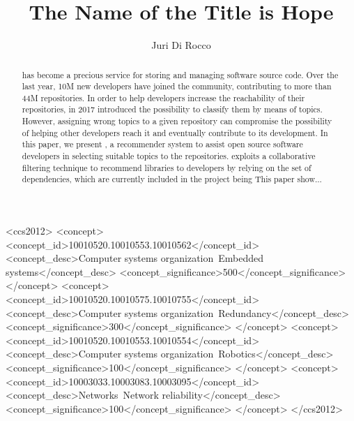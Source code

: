 \documentclass[sigconf]{acmart}
\begin{document}
\title{The Name of the Title is Hope}



\author{Juri Di Rocco}
\affiliation{%
  \institution{Universit\'a degli studi dell'Aquila}
}

\renewcommand{\shortauthors}{Juri Di Rocco, et al.}

\begin{abstract}
\GH has become a precious service for  storing and managing software source code. Over the last year, 10M new developers have joined the \GH community, contributing to more than 44M repositories. In order to help developers increase the reachability of their 	repositories, in 2017 \GH introduced the possibility to classify them by 	means of topics. However, assigning wrong topics to a given repository can 	compromise the possibility of helping other developers reach it and eventually contribute to its development.
In this paper, we present \RECOMMENDER, a recommender system to assist open source software developers in selecting suitable topics to the repositories. \RECOMMENDER exploits a collaborative filtering technique to recommend libraries to developers by relying on the set of dependencies, which are currently included in the project being 
This paper show...
\end{abstract}

\begin{CCSXML}
<ccs2012>
 <concept>
  <concept_id>10010520.10010553.10010562</concept_id>
  <concept_desc>Computer systems organization~Embedded systems</concept_desc>
  <concept_significance>500</concept_significance>
 </concept>
 <concept>
  <concept_id>10010520.10010575.10010755</concept_id>
  <concept_desc>Computer systems organization~Redundancy</concept_desc>
  <concept_significance>300</concept_significance>
 </concept>
 <concept>
  <concept_id>10010520.10010553.10010554</concept_id>
  <concept_desc>Computer systems organization~Robotics</concept_desc>
  <concept_significance>100</concept_significance>
 </concept>
 <concept>
  <concept_id>10003033.10003083.10003095</concept_id>
  <concept_desc>Networks~Network reliability</concept_desc>
  <concept_significance>100</concept_significance>
 </concept>
</ccs2012>
\end{CCSXML}
\end{document}
